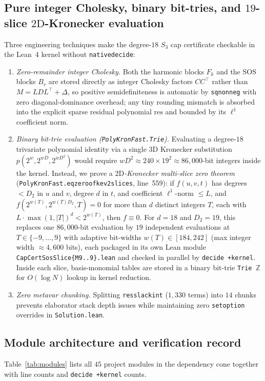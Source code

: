 \documentclass[11pt,reqno]{amsart}
\renewcommand{\_}{\origunderscore\allowbreak}
\theoremstyle{definition}
\newcommand{\Z}{\mathbb{Z}}
\begin{document}
\subsection{Pure integer Cholesky, binary bit-tries, and $19$-slice $2\text{D}$-Kronecker evaluation}\label{subsec:kron}
Three engineering techniques make the degree-$18$ $S_3$ cap certificate checkable in the Lean~4 kernel without \texttt{native\_decide}:
\begin{enumerate}[leftmargin=2.2em]
  \item \emph{Zero-remainder integer Cholesky.} Both the harmonic blocks $F_k$ and the SOS blocks $B_r$ are stored directly as integer Cholesky factors $C C^\top$ rather than $M = LDL^\top + \Delta$, so positive semidefiniteness is automatic by \texttt{sq\_nonneg} with zero diagonal-dominance overhead; any tiny rounding mismatch is absorbed into the explicit sparse residual polynomial $\mathrm{res}$ and bounded by its $\ell^1$ coefficient norm.
  \item \emph{Binary bit-trie evaluation (\texttt{PolyKronFast.Trie}).} Evaluating a degree-$18$ trivariate polynomial identity via a single $3\text{D}$ Kronecker substitution $p(2^w, 2^{wD}, 2^{wD^2})$ would require $w D^2 \approx 240 \times 19^2 \approx 86{,}000$-bit integers inside the kernel. Instead, we prove a \emph{$2\text{D}$-Kronecker multi-slice zero theorem} (\texttt{PolyKronFast.eq\_zero\_of\_kev2\_slices}, line~559): if $f(u,v,t)$ has degrees $< D_2$ in $u$ and $v$, degree $d$ in $t$, and coefficient $\ell^1$-norm $\le L$, and $f(2^{w(T)}, 2^{w(T)D_2}, T) = 0$ for more than $d$ distinct integers $T$, each with $L \cdot \max(1,|T|)^d < 2^{w(T)}$, then $f \equiv 0$.
  For $d = 18$ and $D_2 = 19$, this replaces one $86{,}000$-bit evaluation by $19$ independent evaluations at $T \in \{-9,\dots,9\}$ with adaptive bit-widths $w(T) \in [184, 242]$ (max integer width $\approx 4{,}600$ bits), each packaged in its own Lean module \texttt{CapCertSosSlice\{M9..9\}.lean} and checked in parallel by \texttt{decide +kernel}.
  Inside each slice, basis-monomial tables are stored in a binary bit-trie \texttt{Trie $\Z$} for $O(\log N)$ lookup in kernel reduction.
  \item \emph{Zero metavar chunking.} Splitting \texttt{res\_slack\_int} ($1{,}330$ terms) into $14$ chunks prevents elaborator stack depth issues while maintaining zero \texttt{set\_option} overrides in \texttt{Solution.lean}.
\end{enumerate}

\subsection{Module architecture and verification record}\label{subsec:modules}
Table~\ref{tab:modules} lists all $45$ project modules in the dependency cone together with line counts and \texttt{decide +kernel} counts.
\end{document}

